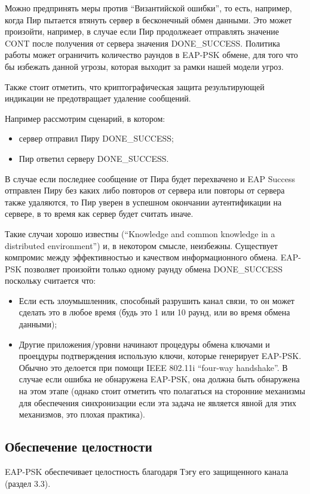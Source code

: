 Можно предпринять меры против ``Византийской ошибки'', то есть, например, когда Пир пытается втянуть сервер в бесконечный обмен данными. Это может произойти, например, в случае если Пир продолжеает отправлять значение CONT после получения от сервера значения DONE\_SUCCESS. Политика работы может ограничить количество раундов в EAP-PSK обмене, для того что бы избежать данной угрозы, которая выходит за рамки нашей модели угроз.

Также стоит отметить, что криптографическая защита результирующей индикации не предотвращает удаление сообщений.

Например рассмотрим сценарий, в котором:
\begin{itemize}
\item сервер отправил Пиру DONE\_SUCCESS;
\item Пир ответил серверу DONE\_SUCCESS.
\end{itemize}

В случае если последнее сообщение от Пира будет перехвачено и EAP Success отправлен Пиру без каких либо повторов от сервера или повторы от сервера также удаляются, то Пир уверен в успешном окончании аутентификации на сервере, в то время как сервер будет считать иначе.

Такие случаи хорошо известны (``Knowledge and common knowledge in a distributed environment'') и, в некотором смысле, неизбежны. Существует компромис между эффективностью и качеством информационного обмена. EAP-PSK позволяет произойти только одному раунду обмена DONE\_SUCCESS поскольку считается что:

\begin{itemize}
\item Если есть злоумышленник, способный разрушить канал связи, то он может сделать это в любое время (будь это 1 или 10 раунд, или во время обмена данными);
\item Другие приложения/уровни начинают процедуры обмена ключами и проецдуры подтверждения использую ключи, которые генерирует EAP-PSK. Обычно это делоется при помощи IEEE 802.11i ``four-way handshake''. В случае если ошибка не обнаружена EAP-PSK, она должна быть обнаружена на этом этапе (однако стоит отметить что полагаться на сторонние механизмы для обеспечения синхронизации если эта задача не является явной для этих механизмов, это плохая практика).
\end{itemize}

\subsection{Обеспечение целостности}

EAP-PSK обеспечивает целостность благодаря Тэгу его защищенного канала (раздел 3.3).


